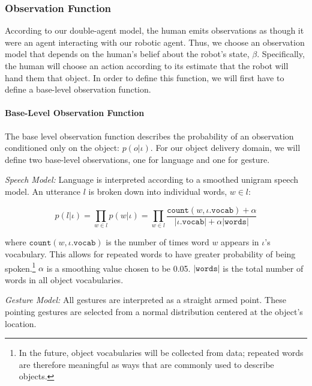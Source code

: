 \documentclass{article}
\begin{document}
\begin{multicols}{2}
\subsubsection{Observation Function} \label{sssec:of}

According to our double-agent model, the human emits observations as though it were an agent interacting with our robotic agent. Thus, we choose an observation model that depends on the human's belief about the robot's state, $\beta$. Specifically, the human will choose an action according to its estimate that the robot will hand them that object. In order to define this function, we will first have to define a base-level observation function. 

\paragraph{Base-Level Observation Function} \label{baseobs}

The base level observation function describes the probability of an observation conditioned only on the object: $p(o|\iota)$. For our object delivery domain, we will define two base-level observations, one for language and one for gesture. 

\vspace{0.5em}

\noindent\textit{Speech Model:} Language is interpreted according to a smoothed unigram speech model. An utterance $l$ is broken down into individual words, $w \in l$: 

\begin{equation*}
	p(l|\iota) = \prod_{w \in l} p(w|\iota) = \prod_{w\in l} \frac{\texttt{count}(w, \iota.\texttt{vocab}) + \alpha}{|\iota.\texttt{vocab}| + \alpha |\texttt{words}|}
\end{equation*}

where $\texttt{count}(w, \iota.\texttt{vocab})$ is the number of times word $w$ appears in $\iota$'s vocabulary. This allows for repeated words to have greater probability of being spoken.\footnote{In the future, object vocabularies will be collected from data; repeated words are therefore meaningful as ways that are commonly used to describe objects.}  $\alpha$ is a smoothing value chosen to be 0.05.  $|\texttt{words}|$ is the total number of words in all object vocabularies. 
\vspace{0.5em}

\noindent\textit{Gesture Model:} All gestures are interpreted as a straight armed point. These pointing gestures are selected from a normal distribution centered at the object's location. 


\end{multicols}
\end{document}
